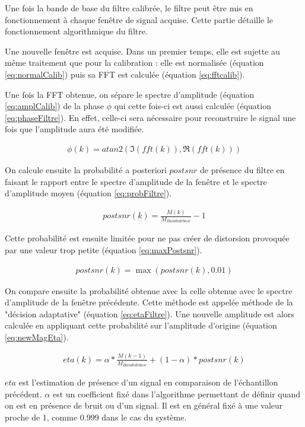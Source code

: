 \documentclass[letterpaper, twoside, 12pt, memoire, creativecommons, hyperref]{thETS}
\begin{document}
Une fois la bande de base du filtre calibrée, le filtre peut être mis en fonctionnement à chaque fenêtre de signal acquise. Cette partie détaille le fonctionnement algorithmique du filtre. 

Une nouvelle fenêtre est acquise. Dans un premier temps, elle est sujette au même traitement que pour la calibration : elle est normalisée (équation \ref{eq:normalCalib}) puis sa FFT est calculée (équation \ref{eq:fftcalib}).

Une fois la FFT obtenue, on sépare le spectre d'amplitude (équation \ref{eq:amplCalib}) de la phase $\phi$ qui cette fois-ci est aussi calculée (équation \ref{eq:phaseFiltre}). En effet, celle-ci sera nécessaire pour reconstruire le signal une fois que l'amplitude aura été modifiée.

\begin{align}\label{eq:phaseFiltre}
   \phi(k) = atan2(\Im(fft(k)), \Re(fft(k)))
\end{align}

On calcule ensuite la probabilité a posteriori $postsnr$ de présence du filtre en faisant le rapport entre le spectre d'amplitude de la fenêtre et le spectre d'amplitude moyen (équation \ref{eq:probFiltre}).

\begin{align}\label{eq:probFiltre}
   postsnr(k) = \frac{M(k)}{M_{Bande de base}} - 1
\end{align}

Cette probabilité est ensuite limitée pour ne pas créer de distorsion provoquée par une valeur trop petite (équation \ref{eq:maxPostsnr}).

\begin{align}\label{eq:maxPostsnr}
   postsnr(k) = \max(postsnr(k), 0.01)
\end{align}

On compare ensuite la probabilité obtenue avec la celle obtenue avec le spectre d'amplitude de la fenêtre précédente. Cette méthode est appelée méthode de la "décision adaptative" (équation \ref{eq:etaFiltre}). Une nouvelle amplitude est alors calculée en appliquant cette probabilité sur l'amplitude d'origine (équation \ref{eq:newMagEta}).

\begin{align}\label{eq:etaFiltre}
   eta(k) = \alpha * \frac{M(k-1)}{M_{Bande de base}} + (1 - \alpha) * postsnr(k)
\end{align}

$eta$ est l'estimation de présence d'un signal en comparaison de l'échantillon précédent. $\alpha$ est un coefficient fixé dans l'algorithme permettant de définir quand on est en présence de bruit ou d'un signal. Il est en général fixé à une valeur proche de 1, comme 0.999 dans le cas du système.
\end{document}
